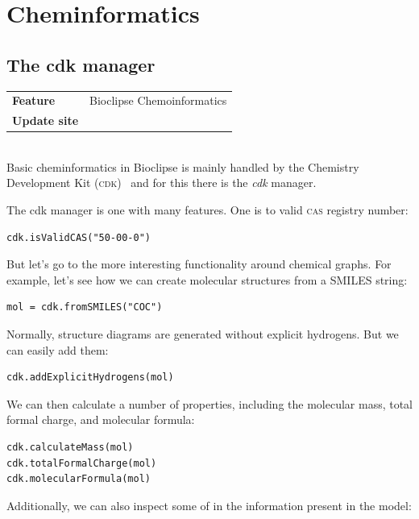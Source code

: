 \documentclass[a5paper, 10pt]{memoir}
\renewcommand{\todo}[1]{{\color{white}\oldtodo{\textsf{#1}}}}
\begin{document}
\chapter{Cheminformatics}
\begin{refsection}


\section{The cdk manager}

\begin{tabular}{ll}
\textbf{Feature} & Bioclipse Chemoinformatics \\
\textbf{Update site} & \url{} \\
\end{tabular} \\

\noindent
Basic cheminformatics in Bioclipse is mainly handled by the Chemistry
Development Kit
(\textsc{cdk})~\cite{Steinbeck2003,Steinbeck2006} and for this there is the
\emph{cdk} manager.

The cdk manager is one with many features. One is to valid\todo{validate?}
\textsc{cas}\todo{explain \textsc{cas}} registry number:

\begin{Verbatim}
cdk.isValidCAS("50-00-0")
\end{Verbatim}
But let's go to the more interesting functionality around chemical graphs. For
example, let's see how we can create molecular structures from a SMILES
string:

\begin{Verbatim}
mol = cdk.fromSMILES("COC")
\end{Verbatim}
Normally, structure diagrams are generated without explicit hydrogens. But we
can easily add them:

\begin{Verbatim}
cdk.addExplicitHydrogens(mol)
\end{Verbatim}
We can then calculate a number of properties, including the molecular
mass, total formal charge, and molecular
formula:

\begin{Verbatim}
cdk.calculateMass(mol)
cdk.totalFormalCharge(mol)
cdk.molecularFormula(mol)
\end{Verbatim}
Additionally, we can also inspect some of in the information present in the
model:


\end{refsection}
\end{document}
